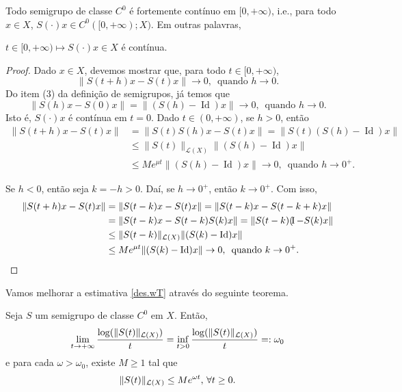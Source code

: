 \begin{corollary}\label{Scontinua}
Todo semigrupo de classe $C^0$ é fortemente contínuo em $[0,+\infty)$, i.e., 
para todo $x\in X$, $S(\cdot)x\in C^0([0,+\infty);X)$. Em outras palavras,
\begin{center}
$t\in [0,+\infty)\longmapsto S(\cdot)x\in  X$ é contínua.
\end{center}
\end{corollary}

\begin{proof}
    Dado $x\in X$, devemos mostrar que, para todo $t\in [0,+\infty)$,
    \[\|S(t+h)x-S(t)x\|\to 0,\, \text{ quando } h\to 0.\]
Do item (3) da definição de semigrupos, já temos que
  \[\|S(h)x-S(0)x\|=\|(S(h)-\operatorname{Id})x\|\to 0,\, \text{ quando } h\to 0.\]
Isto é, $S(\cdot)x$ é contínua em $t=0$. Dado $t\in (0,+\infty)$, se $h>0$, então
\begin{align*}
    \|S(t+h)x-S(t)x\|& =\|S(t)S(h)x-S(t)x\|=\|S(t)(S(h)-\operatorname{Id})x\|\\
    & \leq \|S(t)\|_{\mathcal{L}(X)}\|(S(h)-\operatorname{Id})x\|\\
    & \leq Me^{\mu t}\|(S(h)-\operatorname{Id})x\|\to 0,\, \text{ quando } h\to 0^+.
\end{align*}

Se $h<0$, então seja $k=-h>0$. Daí, se $h\to 0^+$, então $k\to0^+$. Com isso,
\begin{align*}
    \|S(t+h)x-S(t)x\|& = \|S(t-k)x-S(t)x\|=\|S(t-k)x-S(t-k+k)x\|\\
    & =\|S(t-k)x-S(t-k)S(k)x\|=\|S(t-k)(\operatorname{\!I}-S(k)x\|\\
    & \leq \|S(t-k)\|_{\mathcal{L}(X)}\|(S(k)-\operatorname{Id})x\|\\
    & \leq Me^{\mu t}\|(S(k)-\operatorname{Id})x\|\to 0,\, \text{ quando } k\to 0^+.
\end{align*}
\end{proof}

Vamos melhorar a estimativa \eqref{des.wT} através do seguinte teorema. 
\begin{theorem}\label{th2.5}
Seja $S$ um semigrupo de classe $C^0$ em $X$. Então,
\[\lim\limits_{t\to +\infty}\frac{\log(\|S(t)\|_{\mathcal{L}(X)})}{t}=\inf\limits_{t>0}\frac{\log(\|S(t)\|_{\mathcal{L}(X)})}{t}=:\omega_0\]
e para cada $\omega>\omega_0$, existe {$M\geq 1$} tal que 
\begin{equation}\label{Sbound}
{\|S(t)\|_{\mathcal{L}(X)}\leq Me^{\omega t},\, \forall t\geq 0.}
\end{equation}
\end{theorem} 


